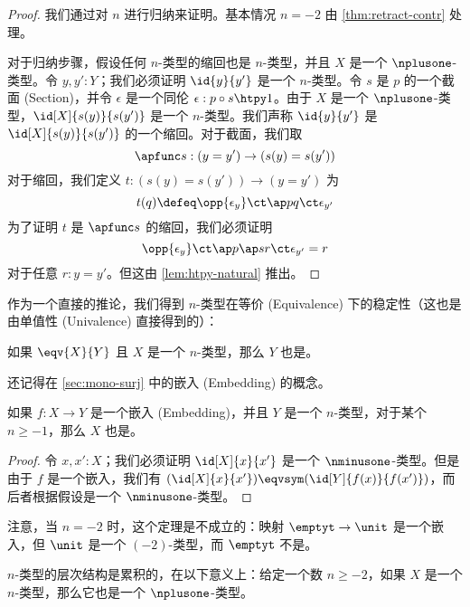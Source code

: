 \begin{proof}
    我们通过对 $n$ 进行归纳来证明。基本情况 $n=-2$ 由 \cref{thm:retract-contr} 处理。

    对于归纳步骤，假设任何 $n$-类型的缩回也是 $n$-类型，并且 $X$ 是一个 $\nplusone$-类型。令 $y, y' : Y$；我们必须证明 $\id{y}{y'}$ 是一个 $n$-类型。令 $s$ 是 $p$ 的一个截面 (Section)，并令 $\epsilon$ 是一个同伦 $\epsilon : p \circ s \htpy 1$。由于 $X$ 是一个 $\nplusone$-类型，$\id[X]{s(y)}{s(y')}$ 是一个 $n$-类型。我们声称 $\id{y}{y'}$ 是 $\id[X]{s(y)}{s(y')}$ 的一个缩回。对于截面，我们取
    \[ \apfunc s : (y=y') \to (s(y)=s(y')) \]
    对于缩回，我们定义 $t:(s(y)=s(y'))\to(y=y')$ 为
    \[ t(q) \defeq  \opp{\epsilon_y} \ct \ap p q \ct \epsilon_{y'} \]
    为了证明 $t$ 是 $\apfunc s$ 的缩回，我们必须证明
    \[ \opp{\epsilon_y} \ct \ap p {\ap sr} \ct \epsilon_{y'} = r \]
    对于任意 $r:y=y'$。但这由 \cref{lem:htpy-natural} 推出。
\end{proof}

作为一个直接的推论，我们得到 $n$-类型在等价 (Equivalence) 下的稳定性（这也是由单值性 (Univalence) 直接得到的）：

\begin{cor}\label{cor:preservation-hlevels-weq}
如果 $\eqv{X}{Y}$ 且 $X$ 是一个 $n$-类型，那么 $Y$ 也是。
\end{cor}

还记得在 \cref{sec:mono-surj} 中的嵌入 (Embedding) 的概念。

\begin{thm}\label{thm:isntype-mono}
如果 $f:X\to Y$ 是一个嵌入 (Embedding)，并且 $Y$ 是一个 $n$-类型，对于某个 $n\ge -1$，那么 $X$ 也是。
\end{thm}
\begin{proof}
    令 $x,x':X$；我们必须证明 $\id[X]{x}{x'}$ 是一个 $\nminusone$-类型。但是由于 $f$ 是一个嵌入，我们有 $(\id[X]{x}{x'}) \eqvsym (\id[Y]{f(x)}{f(x')})$，而后者根据假设是一个 $\nminusone$-类型。
\end{proof}

注意，当 $n=-2$ 时，这个定理是不成立的：映射 $\emptyt \to \unit$ 是一个嵌入，但 $\unit$ 是一个 $(-2)$-类型，而 $\emptyt$ 不是。

\begin{thm}\label{thm:hlevel-cumulative}
$n$-类型的层次结构是累积的，在以下意义上：给定一个数 $n \geq -2$，如果 $X$ 是一个 $n$-类型，那么它也是一个 $\nplusone$-类型。
\end{thm}

